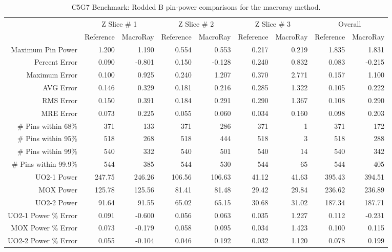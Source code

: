 {{{{        \begin{table}[htbp]
          \centering
          \caption{C5G7 Benchmark: Rodded B pin-power comparisons for the macroray method. \label{tab:MR:C5G7:Rodded B-MacroRay}}
          \scriptsize
          \begin{tabular}{rrrrrrrrr}\toprule
                                  & \multicolumn{2}{c}{Z Slice \# 1} & \multicolumn{2}{c}{Z Slice \# 2} & \multicolumn{2}{c}{Z Slice \# 3} & \multicolumn{2}{c}{Overall}\\
                                  & Reference & MacroRay & Reference & MacroRay & Reference & MacroRay & Reference & MacroRay\\\midrule
            Maximum Pin Power     & 1.200 & 1.190 & 0.554 & 0.553 & 0.217 & 0.219 & 1.835 & 1.831\\
            Percent Error         & 0.090 & -0.801 & 0.150 & -0.128 & 0.240 & 0.832 & 0.083 & -0.215\\\midrule
            Maximum Error         & 0.100 & 0.925 & 0.240 & 1.207 & 0.370 & 2.771 & 0.157 & 1.100\\
            AVG Error             & 0.146 & 0.329 & 0.181 & 0.216 & 0.285 & 1.322 & 0.105 & 0.222\\
            RMS Error             & 0.150 & 0.391 & 0.184 & 0.291 & 0.290 & 1.367 & 0.108 & 0.290\\
            MRE Error             & 0.073 & 0.225 & 0.055 & 0.060 & 0.034 & 0.160 & 0.098 & 0.203\\\midrule
            \# Pins within 68\%   & 371 & 133 & 371 & 286 & 371 & 1 & 371 & 172\\
            \# Pins within 95\%   & 518 & 268 & 518 & 444 & 518 & 3 & 518 & 288\\
            \# Pins within 99\%   & 540 & 332 & 540 & 501 & 540 & 14 & 540 & 342\\
            \# Pins within 99.9\% & 544 & 385 & 544 & 530 & 544 & 65 & 544 & 405\\\midrule
            UO2-1 Power           & 247.75 & 246.26 & 106.56 & 106.63 & 41.12 & 41.63 & 395.43 & 394.51\\
            MOX Power             & 125.78 & 125.56 & 81.41 & 81.48 & 29.42 & 29.84 & 236.62 & 236.89\\
            UO2-2 Power           & 91.64 & 91.55 & 65.02 & 65.15 & 30.68 & 31.02 & 187.34 & 187.71\\
            UO2-1 Power \% Error  & 0.091 & -0.600 & 0.056 & 0.063 & 0.035 & 1.227 & 0.112 & -0.231\\
            MOX Power \% Error    & 0.073 & -0.179 & 0.058 & 0.095 & 0.034 & 1.423 & 0.100 & 0.115\\
            UO2-2 Power \% Error  & 0.055 & -0.104 & 0.046 & 0.192 & 0.032 & 1.120 & 0.078 & 0.199\\\bottomrule
          \end{tabular}
        \end{table}

}}}}
